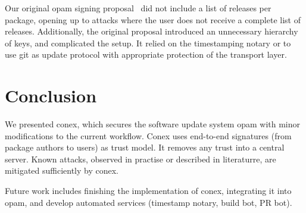 \documentclass[nocopyrightspace]{sigplanconf}
\begin{document}
Our original opam signing proposal~\cite{opamsigning} did not include a list of releases per package, opening up to attacks where the user does not receive a complete list of releases.
Additionally, the original proposal introduced an unnecessary hierarchy of keys, and complicated the setup.
It relied on the timestamping notary or to use git as update protocol with appropriate protection of the transport layer.

\section{Conclusion} \label{sec:conclusion}
We presented conex, which secures the software update system opam with minor modifications to the current workflow.
Conex uses end-to-end signatures (from package authors to users) as trust model.
It removes any trust into a central server.
Known attacks, observed in practise or described in literaturre, are mitigated sufficiently by conex.

Future work includes finishing the implementation of conex, integrating it into opam, and develop automated services (timestamp notary, build bot, PR bot).



\end{document}
